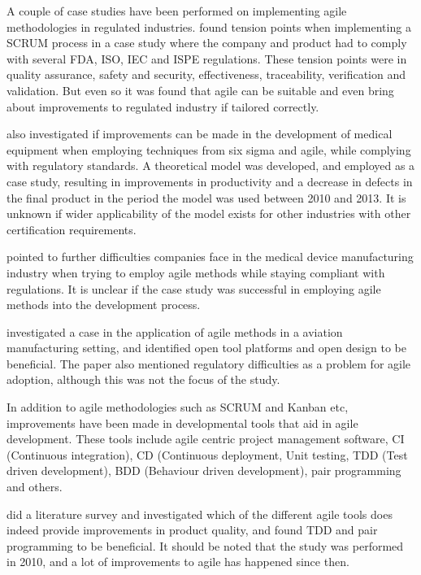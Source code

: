 \documentclass[conference]{IEEEtran}
\begin{document}
A couple of case studies have been performed on implementing agile methodologies in regulated industries. \cite{Fitzgerald_2013} found tension points when implementing a SCRUM process in a case study where the company and product had to comply with several FDA, ISO, IEC and ISPE regulations. These tension points were in quality assurance, safety and security, effectiveness, traceability, verification and validation. But even so it was found that agile can be suitable and even bring about improvements to regulated industry if tailored correctly. 

\cite{Shenvi_2014} also investigated if improvements can be made in the development of medical equipment when employing techniques from six sigma and agile, while complying with regulatory standards. A theoretical model was developed, and employed as a case study, resulting in improvements in productivity and a decrease in defects in the final product in the period the model was used between 2010 and 2013. It is unknown if wider applicability of the model exists for other industries with other certification requirements. 

\cite{Hrgarek_2012} pointed to further difficulties companies face in the medical device manufacturing industry when trying to employ agile methods while staying compliant with regulations. It is unclear if the case study was successful in employing agile methods into the development process.

\cite{Glas_2009} investigated a case in the application of agile methods in a aviation manufacturing setting, and identified open tool platforms and open design to be beneficial. The paper also mentioned regulatory difficulties as a problem for agile adoption, although this was not the focus of the study. 

In addition to agile methodologies such as SCRUM and Kanban etc, improvements have been made in developmental tools that aid in agile development. These tools include agile centric project management software, CI (Continuous integration), CD (Continuous deployment, Unit testing, TDD (Test driven development), BDD (Behaviour driven development), pair programming and others. 

\cite{Sfetsos_2010} did a literature survey and investigated which of the different agile tools does indeed provide improvements in product quality, and found TDD and pair programming to be beneficial. It should be noted that the study was performed in 2010, and a lot of improvements to agile has happened since then.
\end{document}
